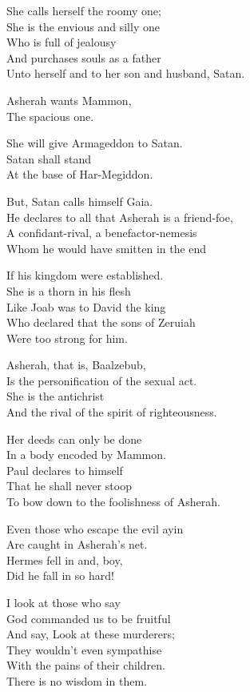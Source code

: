 \documentclass[
]{book}
\begin{document}
She calls herself the roomy one;\\
She is the envious and silly one\\
Who is full of jealousy\\
And purchases souls as a father\\
Unto herself and to her son and husband, Satan.

Asherah wants Mammon,\\
The spacious one.

She will give Armageddon to Satan.\\
Satan shall stand\\
At the base of Har-Megiddon.

But, Satan calls himself Gaia.\\
He declares to all that Asherah is a friend-foe,\\
A confidant-rival, a benefactor-nemesis\\
Whom he would have smitten in the end

If his kingdom were established.\\
She is a thorn in his flesh\\
Like Joab was to David the king\\
Who declared that the sons of Zeruiah\\
Were too strong for him.

Asherah, that is, Baalzebub,\\
Is the personification of the sexual act.\\
She is the antichrist\\
And the rival of the spirit of righteousness.

Her deeds can only be done\\
In a body encoded by Mammon.\\
Paul declares to himself\\
That he shall never stoop\\
To bow down to the foolishness of Asherah.

Even those who escape the evil ayin\\
Are caught in Asherah's net.\\
Hermes fell in and, boy,\\
Did he fall in so hard!

I look at those who say\\
God commanded us to be fruitful\\
And say, Look at these murderers;\\
They wouldn't even sympathise\\
With the pains of their children.\\
There is no wisdom in them.
\end{document}
